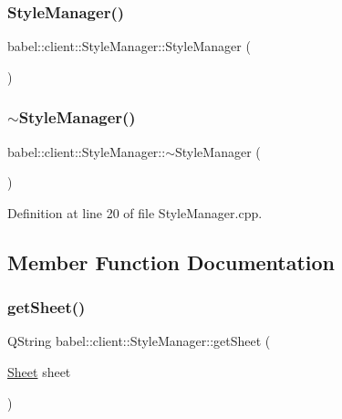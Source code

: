 \subsubsection{\texorpdfstring{Style\+Manager()}{StyleManager()}\hspace{0.1cm}{\footnotesize\ttfamily [2/2]}}
{\footnotesize\ttfamily babel\+::client\+::\+Style\+Manager\+::\+Style\+Manager (\begin{DoxyParamCaption}{ }\end{DoxyParamCaption})}

\mbox{\label{classbabel_1_1client_1_1_style_manager_af89de5ce5a3b422f85dec7605696211f}} 
\subsubsection{\texorpdfstring{$\sim$\+Style\+Manager()}{~StyleManager()}}
{\footnotesize\ttfamily babel\+::client\+::\+Style\+Manager\+::$\sim$\+Style\+Manager (\begin{DoxyParamCaption}{ }\end{DoxyParamCaption})}



Definition at line 20 of file Style\+Manager.\+cpp.



\subsection{Member Function Documentation}
\mbox{\label{classbabel_1_1client_1_1_style_manager_ad4989b460da50299c8aecb2d4249a912}} 
\subsubsection{\texorpdfstring{get\+Sheet()}{getSheet()}}
{\footnotesize\ttfamily Q\+String babel\+::client\+::\+Style\+Manager\+::get\+Sheet (\begin{DoxyParamCaption}\item[{\mbox{\hyperlink{classbabel_1_1client_1_1_style_manager_a187dbf4a4f46c89dd5119496eb2fda52}{Sheet}}}]{sheet }\end{DoxyParamCaption})}



